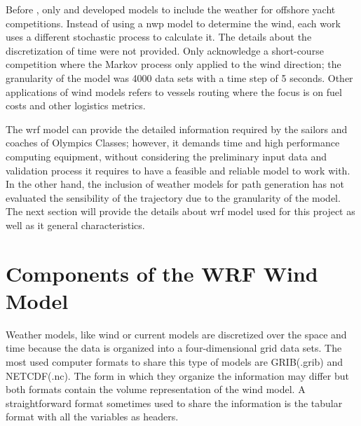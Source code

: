Before \cite{giannaros2018ultrahigh}, only \cite{philpott2001optimising} and \cite{allsopp2000optimal} developed models to include the weather for offshore yacht competitions. Instead of using a \acrshort{nwp} model to determine the wind, each work uses a different stochastic process to calculate it. The details about the discretization of time were not provided. Only \cite{philpott2001optimising} acknowledge a short-course competition where the Markov process only applied to the wind direction; the granularity of the model was 4000 data sets with a time step of 5 seconds. %
Other applications of wind models refers to vessels routing where the focus is on fuel costs and other logistics metrics. \par 
The \acrshort{wrf} model can provide the detailed information required by the sailors and coaches of Olympics Classes; however, it demands time and high performance computing equipment, without considering the preliminary input data and validation process it requires to have a feasible and reliable model to work with. In the other hand, the inclusion of weather models for path generation has not evaluated the sensibility of the trajectory due to the granularity of the model. The next section will provide the details about \acrshort{wrf} model used for this project as well as it general characteristics. \par %

\section{Components of the WRF Wind Model}
Weather models, like wind or current models are discretized over the space and time because the data is organized into a four-dimensional grid data sets. The most used computer formats to share this type of models are GRIB(.grib) and NETCDF(.nc). The form in which they organize the information may differ but both formats contain the volume representation of the wind model. A straightforward format sometimes used to share the information is the tabular format with all the variables as headers. \par

